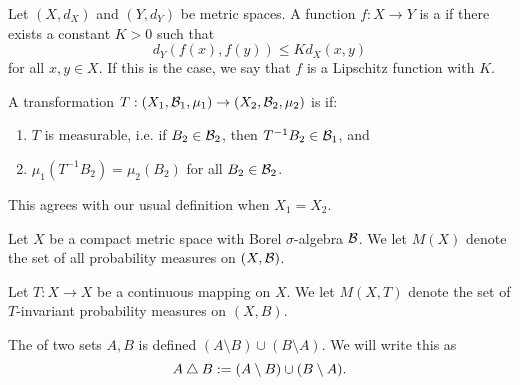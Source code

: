 \begin{definition}
	Let $(X, d_X)$ and $(Y, d_Y)$ be metric spaces. A function $f : X \to Y$ is a  if there exists a constant $K > 0$ such that
	\[
		d_Y(f(x), f(y)) \leq Kd_X(x, y)
	\]
	for all $x, y \in X$. If this is the case, we say that $f$ is a Lipschitz function with  $K$.~\cite[p154]{searcoid:metric-spaces}
\end{definition}

\begin{definition}
	A transformation $T : (X_1, \mathcal{B}_1, \mu_1) \to (X_2, \mathcal{B}_2, \mu_2)$ is  if:
	\begin{enumerate}
		\item $T$ is measurable, i.e. if $B_2 \in \mathcal{B}_2$, then $T^{-1}{B_2} \in \mathcal{B}_1$, and
		\item $\mu_1(T^{-1}{B_2}) = \mu_2(B_2)$ for all $B_2 \in \mathcal{B}_2$.
	\end{enumerate}
	This agrees with our usual definition when $X_1 = X_2$.
\end{definition}

\begin{definition}
	Let $X$ be a compact metric space with Borel $\sigma$-algebra $\mathcal{B}$. We let $M(X)$ denote the set of all probability measures on $(X, \mathcal{B})$.
	
	Let $T : X \to X$ be a continuous mapping on $X$. We let $M(X, T)$ denote the set of $T$-invariant probability measures on $(X, B)$.
\end{definition}

\begin{definition}
	The  of two sets $A, B$ is defined $(A \setminus B) \cup (B \setminus A)$. We will write this as
	\[
		A \bigtriangleup B := (A \setminus B) \cup (B \setminus A).
	\]
\end{definition}